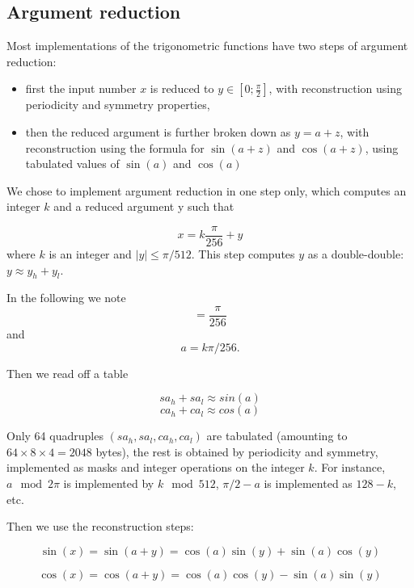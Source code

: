 \subsection{Argument reduction}

Most implementations of the trigonometric functions have two steps of argument reduction: 
\begin{itemize}
\item first the input number $x$ is reduced to $y\in
  [0;\frac{\pi}{2}]$, with reconstruction using periodicity and
  symmetry properties,
\item then the reduced argument is further broken down as $y=a+z$,
  with reconstruction using the formula for $\sin(a+z)$ and
  $\cos(a+z)$, using tabulated values of $\sin(a)$ and
  $\cos(a)$
\end{itemize}

We chose to implement argument reduction in one step only, which
computes an integer $k$ and a reduced argument y such that

\begin{equation}
  x = k\frac{\pi}{256} + y\label{eq:trigoargred}
\end{equation}
where $k$ is an integer and  $ |y| \leq {\pi}/{512}$.
This step computes $y$ as a double-double: $y\approx y_h+y_l$. 

In the following we note $$=\frac{\pi}{256}$$ and $$a=k\pi/256.$$ 

Then we read off a table 

$$sa_h+sa_l \approx sin(a)$$
$$ca_h+ca_l \approx cos(a)$$

Only 64 quadruples $(sa_h,sa_l,ca_h,ca_l)$ are tabulated (amounting to
$64\times 8 \times 4 = 2048$ bytes), the rest is obtained by
periodicity and symmetry, implemented as masks and integer operations
on the integer $k$. For instance,  $a \mod 2\pi$ is implemented by $k \mod 512$,
$\pi/2-a$ is implemented as $128-k$, etc.



Then we use the reconstruction steps:

\begin{equation}        
  \sin(x) = \sin(a + y) =  \cos(a) \sin(y) +  \sin(a) \cos(y) 
  \label{eq:sinapy}
\end{equation}

\begin{equation}
  \cos(x) = \cos(a + y) = \cos(a) \cos(y) -  \sin(a) \sin(y) 
  \label{eq:cosapy}
\end{equation}

